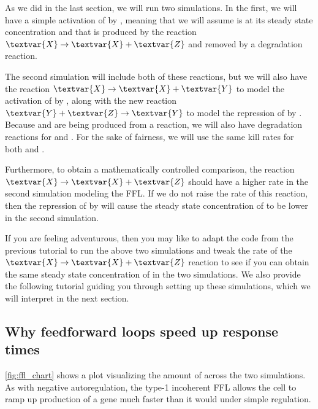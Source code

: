 As we did in the last section, we will run two simulations. In the first, we will have a simple activation of  by , meaning that we will assume  is at its steady state concentration and that  is produced by the reaction $\textvar{X} \rightarrow \textvar{X} + \textvar{Z}$ and removed by a degradation reaction.

The second simulation will include both of these reactions, but we will also have the reaction $\textvar{X} \rightarrow \textvar{X} + \textvar{Y}$ to model the activation of  by , along with the new reaction $\textvar{Y} + \textvar{Z} \rightarrow \textvar{Y}$ to model the repression of  by . Because  and  are being produced from a reaction, we will also have degradation reactions for  and . For the sake of fairness, we will use the same kill rates for both  and .

Furthermore, to obtain a mathematically controlled comparison, the reaction $\textvar{X} \rightarrow \textvar{X} + \textvar{Z}$ should have a higher rate in the second simulation modeling the FFL. If we do not raise the rate of this reaction, then the repression of  by  will cause the steady state concentration of  to be lower in the second simulation.

If you are feeling adventurous, then you may like to adapt the code from the previous tutorial to run the above two simulations and tweak the rate of the $\textvar{X} \rightarrow \textvar{X} + \textvar{Z}$ reaction to see if you can obtain the same steady state concentration of  in the two simulations. We also provide the following tutorial guiding you through setting up these simulations, which we will interpret in the next section.


\FloatBarrier
{}
\subsection{Why feedforward loops speed up response times}

\autoref{fig:ffl_chart} shows a plot visualizing the amount of  across the two simulations. As with negative autoregulation, the type-1 incoherent FFL allows the cell to ramp up production of a gene  much faster than it would under simple regulation.\\

